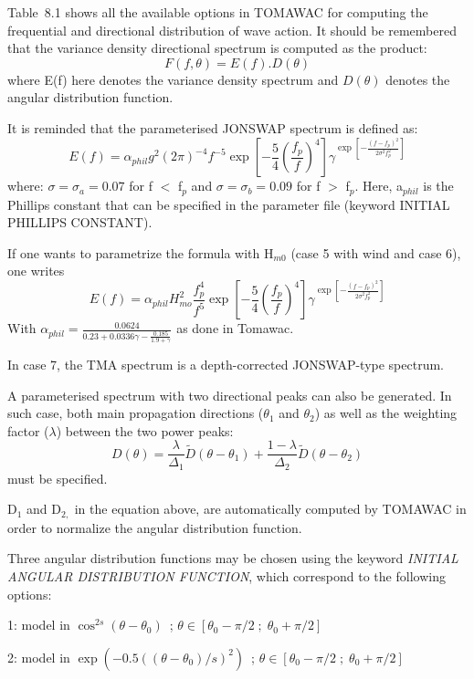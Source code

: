 Table~8.1 shows all the available options in TOMAWAC for computing the frequential and directional distribution of wave action. It should be remembered that the variance density directional spectrum is computed as the product:
\[F(f,\theta )=E(f).D(\theta )\]
where E(f) here denotes the variance density spectrum and $D\left(\theta \right)$ denotes the angular distribution function.

 It is reminded that the parameterised JONSWAP spectrum is defined as:
\[E(f)=\alpha _{phil} g^{2} (2\pi )^{-4} f^{-5} \exp \left[-\frac{5}{4} \left(\frac{f_{p}^{} }{f^{} } \right)^{4} \right]\gamma ^{\exp \left[-\frac{\left(f-f_{p} \right)^{2} }{2\sigma ^{2} f_{p}^{2} } \right]} \]
where:  $\sigma =\sigma _{a} =0.07$ for f $<$ f${}_{p}$  and  $\sigma =\sigma _{b} =0.09$ for f $>$ f${}_{p}$. Here, a${}_{phil}$  is the Phillips constant that can be specified in the parameter file (keyword INITIAL PHILLIPS CONSTANT).

 If one wants to parametrize the formula with H${}_{m0}$ (case 5 with wind and case 6), one writes
\[E(f)=\alpha _{phil} H_{mo}^{2} \frac{f_{p}^{4} }{f^{5} } \exp \left[-\frac{5}{4} \left(\frac{f_{p}^{} }{f^{} } \right)^{4} \right]\gamma ^{\exp \left[-\frac{\left(f-f_{p} \right)^{2} }{2\sigma ^{2} f_{p}^{2} } \right]} \]
With $\alpha _{phil} =\frac{0.0624}{0.23+0.0336\gamma -\frac{0.185}{1.9+\gamma } } $ as done in Tomawac.



 In case 7, the TMA spectrum is a depth-corrected JONSWAP-type spectrum.

 A parameterised spectrum with two directional peaks can also be generated. In such case, both main propagation directions ($\theta _{1} $ and $\theta _{2} $) as well as the weighting factor ($\lambda $) between the two power peaks:
\[D(\theta )=\frac{\lambda }{\Delta _{1} } \tilde{D}(\theta -\theta _{1} )+\frac{1-\lambda }{\Delta _{2} } \tilde{D}(\theta -\theta _{2} )\]
must be specified.

 D${}_{1}$ and D${}_{2,}$ in the equation above, are automatically computed by TOMAWAC in order to normalize the angular distribution function.

 Three angular distribution functions may be chosen using the keyword \textit{INITIAL ANGULAR DISTRIBUTION FUNCTION}, which correspond to the following options:

 1:  model in $\cos ^{2s} (\theta -\theta _{0} )$~; $\theta \in \left[\theta _{0} -\pi /2\; ;\; \theta _{0} +\pi /2\right]$

 2:  model in $\exp \left(-0.5\left(\left(\theta -\theta _{0} \right)/s\right)^{2} \right)$~; $\theta \in \left[\theta _{0} -\pi /2\; ;\; \theta _{0} +\pi /2\right]$

